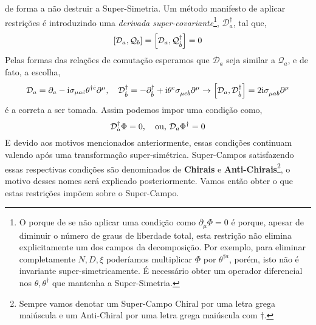 de forma a não destruir a Super-Simetria. Um método manifesto de aplicar restrições é introduzindo uma \textit{derivada super-covariante}\footnote{O porque de se não aplicar uma condição como $\partial_\mu\Phi=0$ é porque, apesar de diminuir o número de graus de liberdade total, esta restrição não elimina explicitamente um dos campos 
da decomposição. Por exemplo, para eliminar completamente $N, D,\xi$ poderíamos multiplicar $\Phi$ por $\theta^{\dagger\dot a}$, porém, isto não é invariante super-simetricamente. É necessário obter um operador diferencial nos $\theta,\theta^\dagger$ que 
mantenha a Super-Simetria.}, $\mathcal D_a^\dagger$, tal que,\[\comm{\mathcal D_a}{\mathcal Q_b}=\comm{\mathcal D_a}{\mathcal Q^\dagger_{\dot b}}=0\] Pelas 
formas das relações de comutação esperamos que $\mathcal D_a$ seja similar a $\mathcal Q_a$, e de fato, a escolha,\[\mathcal D_a=\partial_a-\im\sigma_{\mu a\dot c}\theta^{\dagger \dot c}\partial^\mu,\ \ \ \mathcal D^\dagger_{\dot b}=-\partial^\dagger_{\dot b}+\im\theta^c\sigma_{\mu c\dot b}\partial^\mu\rightarrow \comm{\mathcal D_a}{\mathcal D^\dagger_{\dot b}}=2\im\sigma_{\mu a\dot b}\partial^\mu\] é a correta a ser tomada. 
Assim podemos impor uma condição como, \[\mathcal D_{\dot a}^\dagger\Phi=0,\ \ \ \textnormal{ou, }\mathcal D_a\Phi^\dagger=0\] E devido aos motivos mencionados anteriormente, 
essas condições continuam valendo após uma transformação super-simétrica. Super-Campos satisfazendo essas respectivas condições são denominados de \textbf{Chirais} e \textbf{Anti-Chirais}\footnote{Sempre 
vamos denotar um Super-Campo Chiral por uma letra grega maiúscula e um Anti-Chiral por uma letra grega maiúscula com $\dagger$.},
o motivo desses nomes será explicado posteriormente. Vamos então obter o que estas restrições impõem sobre o Super-Campo.

